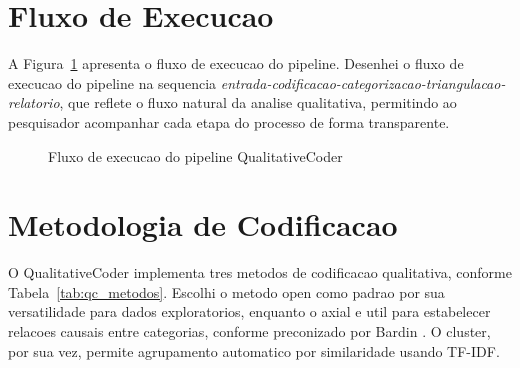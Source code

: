 \section{Fluxo de Execucao}
\label{sec:qc_fluxo}

A Figura~\ref{fig:qc_fluxo} apresenta o fluxo de execucao do pipeline. Desenhei o fluxo de execucao do pipeline na sequencia \textit{entrada-codificacao-categorizacao-triangulacao-relatorio}, que reflete o fluxo natural da analise qualitativa, permitindo ao pesquisador acompanhar cada etapa do processo de forma transparente.

\begin{figure}[htbp]
    \centering
    \caption{Fluxo de execucao do pipeline QualitativeCoder}
    \label{fig:qc_fluxo}
\end{figure}

\section{Metodologia de Codificacao}
\label{sec:qc_metodologia}

O QualitativeCoder implementa tres metodos de codificacao qualitativa, conforme Tabela~\ref{tab:qc_metodos}. Escolhi o metodo open como padrao por sua versatilidade para dados exploratorios, enquanto o axial e util para estabelecer relacoes causais entre categorias, conforme preconizado por Bardin \cite{BARDIN2016}. O cluster, por sua vez, permite agrupamento automatico por similaridade usando TF-IDF.

